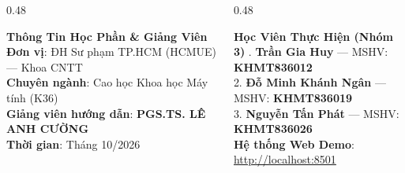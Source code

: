 \documentclass[aspectratio=169, 10pt]{beamer}
\begin{document}
{\begin{frame}[plain]
  \vspace{0.15cm}
  \begin{columns}[t]
    \begin{column}{0.48\textwidth}
      \begin{block}{\small\textbf{Thông Tin Học Phần \& Giảng Viên}}
        \fontsize{7.5}{9.5}\selectfont
        \textbf{Đơn vị}: ĐH Sư phạm TP.HCM (HCMUE) — Khoa CNTT\\
        \textbf{Chuyên ngành}: Cao học Khoa học Máy tính (K36)\\
        \textbf{Giảng viên hướng dẫn}: \textbf{\color{HCMUEDarkBlue}PGS.TS. LÊ ANH CƯỜNG}\\
        \textbf{Thời gian}: Tháng 10/2026
      \end{block}
    \end{column}
    \begin{column}{0.48\textwidth}
      \begin{block}{\small\textbf{Học Viên Thực Hiện (Nhóm 3)}}
        \fontsize{7.5}{9.5}. \textbf{Trần Gia Huy} — MSHV: \textbf{KHMT836012}\\
        2. \textbf{Đỗ Minh Khánh Ngân} — MSHV: \textbf{KHMT836019}\\
        3. \textbf{Nguyễn Tấn Phát} — MSHV: \textbf{KHMT836026}\\
        \textbf{Hệ thống Web Demo}: \url{http://localhost:8501}
      \end{block}
    \end{column}
  \end{columns}
\end{frame}
}
\end{document}

